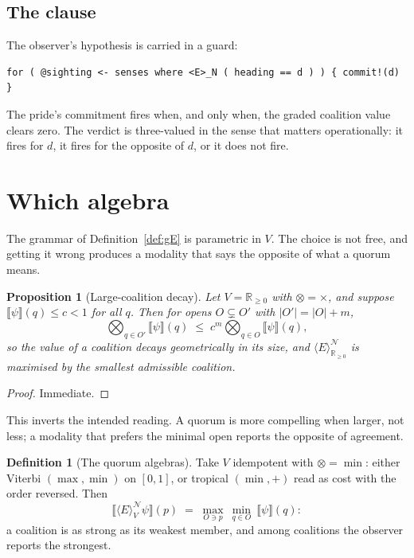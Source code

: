 \documentclass[11pt,a4paper]{article}
\theoremstyle{plain}
\newtheorem{proposition}[theorem]{Proposition}
\theoremstyle{definition}
\newtheorem{definition}[theorem]{Definition}
\theoremstyle{remark}
\newcommand{\gE}[2]{\langle E\rangle^{#1}_{#2}}
\newcommand{\Nsp}{\mathcal{N}}
\newcommand{\Val}{V}
\newcommand{\sem}[1]{\llbracket #1 \rrbracket}
\begin{document}
\subsection{The clause}

The observer's hypothesis is carried in a guard:
\begin{lstlisting}
for ( @sighting <- senses where <E>_N ( heading == d ) ) { commit!(d) }
\end{lstlisting}
The pride's commitment fires when, and only when, the graded coalition value
clears zero. The verdict is three-valued in the sense that matters
operationally: it fires for $d$, it fires for the opposite of $d$, or it does
not fire.

\section{Which algebra}\label{sec:algebra}

The grammar of Definition~\ref{def:gE} is parametric in $\Val$. The choice is
not free, and getting it wrong produces a modality that says the opposite of
what a quorum means.

\begin{proposition}[Large-coalition decay]\label{prop:decay}
Let $\Val = \mathbb{R}_{\ge0}$ with $\otimes = \times$, and suppose
$\sem{\psi}(q) \le c < 1$ for all $q$. Then for opens $O \subsetneq O'$ with
$|O'| = |O| + m$,
\[
\bigotimes_{q\in O'}\sem{\psi}(q) \;\le\; c^{m} \bigotimes_{q\in O}\sem{\psi}(q),
\]
so the value of a coalition decays geometrically in its size, and
$\gE{\Nsp}{\mathbb{R}_{\ge0}}$ is maximised by the \emph{smallest} admissible
coalition.
\end{proposition}

\begin{proof}
Immediate.
\end{proof}

This inverts the intended reading. A quorum is more compelling when larger, not
less; a modality that prefers the minimal open reports the opposite of
agreement.

\begin{definition}[The quorum algebras]\label{def:quorum}
Take $\Val$ idempotent with $\otimes = \min$: either Viterbi
$(\max,\min)$ on $[0,1]$, or tropical $(\min,+)$ read as cost with the order
reversed. Then
\[
\sem{\gE{\Nsp}{\Val}\psi}(p) \;=\; \max_{O \ni p}\ \min_{q\in O}\ \sem{\psi}(q):
\]
a coalition is as strong as its weakest member, and among coalitions the
observer reports the strongest.
\end{definition}
\end{document}
